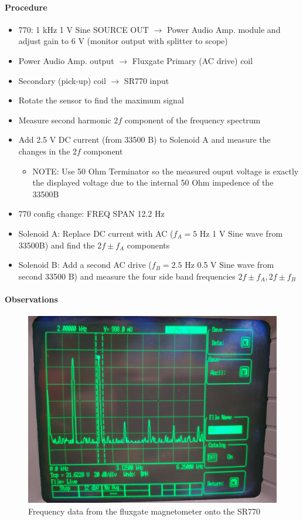 \documentclass[../main.tex]{subfiles}
\begin{document}
\paragraph{Procedure}
\begin{itemize}
    \item 770: 1 kHz 1 V Sine SOURCE OUT $\to$ Power Audio Amp. module and adjust gain to 6 V (monitor output with splitter to scope)
    \item Power Audio Amp. output $\to$ Fluxgate Primary (AC drive) coil
    \item Secondary (pick-up) coil $\to$ SR770 input
    \item Rotate the sensor to find the maximum signal 
    \item Measure second harmonic $2f$ component of the frequency spectrum
    \item Add 2.5 V DC current (from 33500 B) to Solenoid A and measure the changes in the $2f$ component
    \begin{itemize}
        \item NOTE: Use 50 Ohm Terminator so the measured ouput voltage is exactly the displayed voltage due to the internal 50 Ohm impedence of the 33500B
    \end{itemize}
    \item 770 config change: FREQ SPAN 12.2 Hz
    \item Solenoid A: Replace DC current with AC ($f_A = 5$ Hz 1 V Sine wave from 33500B) and find the $2f \pm f_A$ components
    \item Solenoid B: Add a second AC drive ($f_B = 2.5$ Hz 0.5 V Sine wave from second 33500 B) and measure the four side band frequencies $2f \pm f_A, 2f \pm f_B$
\end{itemize}

\newpage
\paragraph{Observations}
\begin{figure}[ht]
    \centering
    \includegraphics[width=0.5\linewidth]{Magnetometer Data.jpg}
    \caption{Frequency data from the fluxgate magnetometer onto the SR770}
    \label{fig:mag data}
\end{figure}
\end{document}
